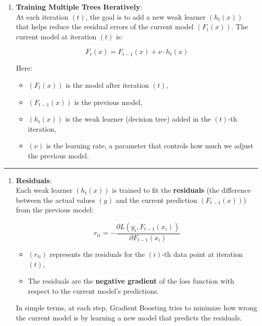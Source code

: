 \documentclass[12pt]{book}
\providecommand{\tightlist}{%
  \setlength{\itemsep}{0pt}\setlength{\parskip}{0pt}}
\begin{document}
\begin{enumerate}
\def\labelenumi{\arabic{enumi}.}
\setcounter{enumi}{1}
\item
  \textbf{Training Multiple Trees Iteratively}:\\
  At each iteration \(( t )\), the goal is to add a new weak learner
  \(( h_t(x) )\) that helps reduce the residual errors of the current
  model \(( F_t(x) )\). The current model at iteration \(( t )\) is:

  \[
  F_t(x) = F_{t-1}(x) + \nu \cdot h_t(x)
  \]

  Here:

  \begin{itemize}
  \tightlist
  \item
    \(( F_t(x) )\) is the model after iteration \(( t )\),
  \item
    \(( F_{t-1}(x) )\) is the previous model,
  \item
    \(( h_t(x) )\) is the weak learner (decision tree) added in the
    \(( t )\)-th iteration,
  \item
    \(( \nu )\) is the learning rate, a parameter that controls how much
    we adjust the previous model.
  \end{itemize}
\end{enumerate}

\begin{center}\rule{0.5\linewidth}{0.5pt}\end{center}

\begin{enumerate}
\def\labelenumi{\arabic{enumi}.}
\setcounter{enumi}{2}
\item
  \textbf{Residuals}:\\
  Each weak learner \(( h_t(x) )\) is trained to fit the
  \textbf{residuals} (the difference between the actual values \(( y )\)
  and the current prediction \(( F_{t-1}(x) )\)) from the previous
  model:

  \[
  r_{ti} = - \frac{\partial L(y_i, F_{t-1}(x_i))}{\partial F_{t-1}(x_i)}
  \]

  \begin{itemize}
  \tightlist
  \item
    \(( r_{ti} )\) represents the residuals for the \(( i )\)-th data
    point at iteration \(( t )\),
  \item
    The residuals are the \textbf{negative gradient} of the loss
    function with respect to the current model's predictions.
  \end{itemize}

  In simple terms, at each step, Gradient Boosting tries to minimize how
  wrong the current model is by learning a new model that predicts the
  residuals.
\end{enumerate}
\end{document}
